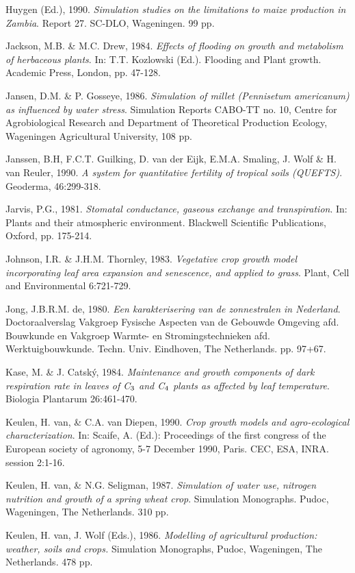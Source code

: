 Huygen (Ed.), 1990. {\it Simulation studies on the limitations to maize production in Zambia\/}. Report 27.
SC-DLO, {\nobreak}Wageningen. 99 pp.

Jackson, M.B. \& M.C. Drew, 1984. {\it Effects of flooding on growth and metabolism of herbaceous
plants\/}. In: T.T. Kozlowski (Ed.). Flooding and Plant growth. Academic Press, London, pp. 47-128.

Jansen, D.M. \& P. Gosseye, 1986. {\it Simulation of millet (Pennisetum americanum) as influenced by
water stress\/}. Simulation Reports CABO-TT no. 10, Centre for Agrobiological Research and
Department of Theoretical Production Ecology, Wageningen Agricultural University, 108 pp.

Janssen, B.H, F.C.T. Guilking, D. van der Eijk, E.M.A. Smaling, J. Wolf \& H. van Reuler, 1990.
{\it A system for quantitative fertility of tropical soils (QUEFTS)\/}. Geoderma, 46:299-318.

Jarvis, P.G., 1981. {\it Stomatal conductance, gaseous exchange and transpiration\/}. In: Plants and their
atmospheric environment. Blackwell Scientific Publications, Oxford, pp. 175-214.

Johnson, I.R. \& J.H.M. Thornley, 1983. {\it Vegetative crop growth model incorporating leaf area
expansion and senescence, and applied to grass\/}. Plant, Cell and Environmental 6:721-729.

Jong, J.B.R.M. de, 1980. {\it Een karakterisering van de zonnestralen in Nederland\/}. Doctoraalverslag
Vakgroep Fysische Aspecten van de Gebouwde Omgeving afd. Bouwkunde en Vakgroep Warmte-
en Stromingstechnieken afd. Werktuigbouwkunde. Techn. Univ. Eindhoven, The Netherlands. pp.
97+67.

Kase, M. \& J. Catsk\'{y}, 1984. {\it Maintenance and growth components of dark respiration rate in leaves
of C$_{{\rm 3}}$ and C$_{{\rm 4}}$ plants as affected by leaf temperature\/}. Biologia Plantarum 26:461-470.

Keulen, H. van, \& C.A. van Diepen, 1990. {\it Crop growth models and agro-ecological charac\-terizati\-on\/}. 
In: Scaife, A. (Ed.): Proceedings of the first con\-gress of the European so\-cie\-ty of agronomy, 5-7
December 1990, Paris. CEC, ESA, INRA. session 2:1-16.

Keulen, H. van, \& N.G. Seligman, 1987. {\it Simulation of water use, nitrogen nutrition and growth of
a spring wheat crop\/}. Simulation Monographs. Pudoc, Wageningen, The Netherlands. 310 pp.

Keulen, H. van, J. Wolf (Eds.), 1986. {\it Modelling of agricultural production: weather, soils and
crops.\/} Simulation Monographs, Pudoc, Wageningen, The Netherlands. 478 pp. 

